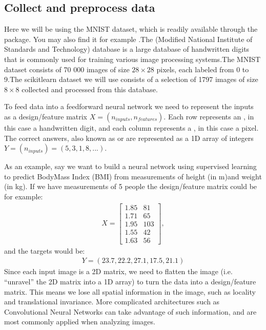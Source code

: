 \documentclass[letterpaper,10pt,english]{sphinxmanual}
\begin{document}
\subsection{Collect and pre\sphinxhyphen{}process data}
\label{\detokenize{chapter6:collect-and-pre-process-data}}
Here we will be using the MNIST dataset, which is readily available through the 
package. You may also find it for example .The  (Modified National Institute of Standards and Technology) database is a large database
of handwritten digits that is commonly used for training various image processing systems.The MNIST dataset consists of 70 000 images of size \(28\times 28\) pixels, each labeled from 0 to 9.The scikit\sphinxhyphen{}learn dataset we will use consists of a selection of 1797 images of size \(8\times 8\) collected and processed from this database.

To feed data into a feed\sphinxhyphen{}forward neural network we need to represent
the inputs as a design/feature matrix \(X = (n_{inputs}, n_{features})\).  Each
row represents an , in this case a handwritten digit, and
each column represents a , in this case a pixel.  The
correct answers, also known as  or  are
represented as a 1D array of integers
\(Y = (n_{inputs}) = (5, 3, 1, 8,...)\).

As an example, say we want to build a neural network using supervised learning to predict Body\sphinxhyphen{}Mass Index (BMI) from
measurements of height (in m)and weight (in kg). If we have measurements of 5 people the design/feature matrix could be for example:
\begin{equation*}
\begin{split} X = \begin{bmatrix}
1.85 & 81\\
1.71 & 65\\
1.95 & 103\\
1.55 & 42\\
1.63 & 56
\end{bmatrix} ,\end{split}
\end{equation*}
and the targets would be:
\begin{equation*}
\begin{split} Y = (23.7, 22.2, 27.1, 17.5, 21.1) \end{split}
\end{equation*}
Since each input image is a 2D matrix, we need to flatten the image
(i.e. “unravel” the 2D matrix into a 1D array) to turn the data into a
design/feature matrix. This means we lose all spatial information in the
image, such as locality and translational invariance. More complicated
architectures such as Convolutional Neural Networks can take advantage
of such information, and are most commonly applied when analyzing
images.
\end{document}

